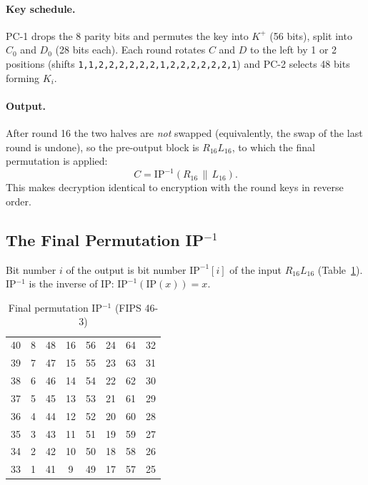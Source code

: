 \documentclass[12pt,a4paper]{article}
\begin{document}
\paragraph{Key schedule.} PC-1 drops the 8 parity bits and permutes the key into $K^+$ (56 bits),
split into $C_0$ and $D_0$ (28 bits each). Each round rotates $C$ and $D$ to the left by 1 or 2
positions (shifts \texttt{1,1,2,2,2,2,2,2,1,2,2,2,2,2,2,1}) and PC-2 selects 48 bits forming $K_i$.

\paragraph{Output.} After round 16 the two halves are \emph{not} swapped (equivalently, the swap of
the last round is undone), so the pre-output block is $R_{16}L_{16}$, to which the final permutation
is applied:
\begin{equation}
  C = \mathrm{IP}^{-1}(R_{16}\,\|\,L_{16}). \label{eq:out}
\end{equation}
This makes decryption identical to encryption with the round keys in reverse order.

\subsection{The Final Permutation IP$^{-1}$}
Bit number $i$ of the output is bit number $\mathrm{IP}^{-1}[i]$ of the input $R_{16}L_{16}$
(Table~\ref{tab:ipinv}). IP$^{-1}$ is the inverse of IP: $\mathrm{IP}^{-1}(\mathrm{IP}(x))=x$.

\begin{table}[H]
\centering
\caption{Final permutation IP$^{-1}$ (FIPS 46-3)}
\label{tab:ipinv}
\begin{tabular}{*{8}{c}}
\toprule
40 & 8 & 48 & 16 & 56 & 24 & 64 & 32 \\
39 & 7 & 47 & 15 & 55 & 23 & 63 & 31 \\
38 & 6 & 46 & 14 & 54 & 22 & 62 & 30 \\
37 & 5 & 45 & 13 & 53 & 21 & 61 & 29 \\
36 & 4 & 44 & 12 & 52 & 20 & 60 & 28 \\
35 & 3 & 43 & 11 & 51 & 19 & 59 & 27 \\
34 & 2 & 42 & 10 & 50 & 18 & 58 & 26 \\
33 & 1 & 41 & 9 & 49 & 17 & 57 & 25 \\
\bottomrule
\end{tabular}
\end{table}
\end{document}
